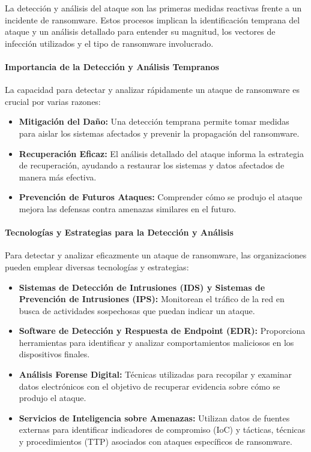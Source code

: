 La detección y análisis del ataque son las primeras medidas reactivas frente a un incidente de ransomware. Estos procesos implican la identificación temprana del ataque y un análisis detallado para entender su magnitud, los vectores de infección utilizados y el tipo de ransomware involucrado.

\paragraph{Importancia de la Detección y Análisis Tempranos}

La capacidad para detectar y analizar rápidamente un ataque de ransomware es crucial por varias razones:

\begin{itemize}
    \item \textbf{Mitigación del Daño:} Una detección temprana permite tomar medidas para aislar los sistemas afectados y prevenir la propagación del ransomware.
    \item \textbf{Recuperación Eficaz:} El análisis detallado del ataque informa la estrategia de recuperación, ayudando a restaurar los sistemas y datos afectados de manera más efectiva.
    \item \textbf{Prevención de Futuros Ataques:} Comprender cómo se produjo el ataque mejora las defensas contra amenazas similares en el futuro.
\end{itemize}

\paragraph{Tecnologías y Estrategias para la Detección y Análisis}

Para detectar y analizar eficazmente un ataque de ransomware, las organizaciones pueden emplear diversas tecnologías y estrategias:

\begin{itemize}
    \item \textbf{Sistemas de Detección de Intrusiones (IDS) y Sistemas de Prevención de Intrusiones (IPS):} Monitorean el tráfico de la red en busca de actividades sospechosas que puedan indicar un ataque.
    \item \textbf{Software de Detección y Respuesta de Endpoint (EDR):} Proporciona herramientas para identificar y analizar comportamientos maliciosos en los dispositivos finales.
    \item \textbf{Análisis Forense Digital:} Técnicas utilizadas para recopilar y examinar datos electrónicos con el objetivo de recuperar evidencia sobre cómo se produjo el ataque.
    \item \textbf{Servicios de Inteligencia sobre Amenazas:} Utilizan datos de fuentes externas para identificar indicadores de compromiso (IoC) y tácticas, técnicas y procedimientos (TTP) asociados con ataques específicos de ransomware.
\end{itemize}

